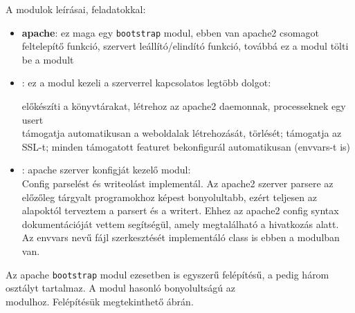 A modulok leírásai, feladatokkal:
\begin{itemize}
	\item \textbf{apache}: ez maga egy \texttt{bootstrap} modul, ebben van apache2 csomagot feltelepítő funkció, szervert leállító/elindító funkció, továbbá ez a modul tölti be a \texttt{} modult
	\item \textbf{}: ez a modul kezeli a szerverrel kapcsolatos legtöbb dolgot:
	
	előkészíti a könyvtárakat, létrehoz az apache2 daemonnak, processeknek egy usert\\támogatja automatikusan a weboldalak létrehozását, törlését; támogatja az SSL-t; minden támogatott featuret bekonfigurál automatikusan (envvars-t is)

	\item \textbf{}: apache szerver konfigját kezelő modul:\\Config parselést és writeolást implementál. Az apache2 szerver parsere az előzőleg tárgyalt programokhoz képest bonyolultabb, ezért teljesen az alapoktól terveztem a parsert és a writert. Ehhez az apache2 config syntax dokumentációját vettem segítségül, amely megtalálható a \cite{apache_configuring} hivatkozás alatt.
	\\Az envvars nevű fájl szerkesztését implementáló class is ebben a modulban van.
\end{itemize}

\pagebreak

Az apache \texttt{bootstrap} modul ezesetben is egyszerű felépítésű, a \texttt{} pedig három osztályt tartalmaz. A \texttt{} modul hasonló bonyolultságú az \\\texttt{} modulhoz. Felépítésük megtekinthető  ábrán.
	
